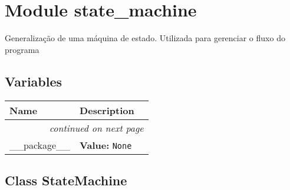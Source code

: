 %
%
%


\section{Module state\_machine}

    \label{state_machine}
Generalização de uma máquina de estado. Utilizada para gerenciar o fluxo do
programa



  \subsection{Variables}

    \vspace{-1cm}
\hspace{\varindent}\begin{longtable}{|p{\varnamewidth}|p{\vardescrwidth}|l}
\cline{1-2}
\cline{1-2} \centering \textbf{Name} & \centering \textbf{Description}& \\
\cline{1-2}
\endhead\cline{1-2}\multicolumn{3}{r}{\small\textit{continued on next page}}\\\endfoot\cline{1-2}
\endlastfoot\raggedright \_\-\_\-p\-a\-c\-k\-a\-g\-e\-\_\-\_\- & \raggedright \textbf{Value:} 
{\tt None}&\\
\cline{1-2}
\end{longtable}



\subsection{Class StateMachine}

